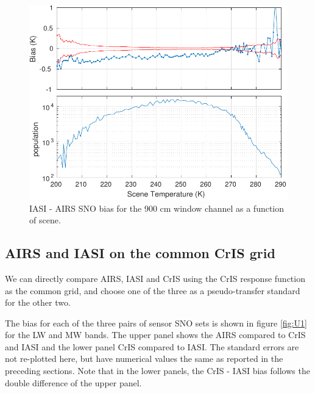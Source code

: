 \documentclass[twocolumn,10pt]{article}
\begin{document}
\begin{figure}[htb]
\centering
\includegraphics[width=\linewidth]{./figs/AI_jplSNO_bias_std_900wn_vScene.pdf}
\caption{\label{fig:orgparagraph20}
   IASI - AIRS SNO bias for the 900 cm window channel as a function of scene.}
\label{fig:Z2}
\end{figure}



\subsection{AIRS and IASI on the common CrIS grid}
\label{sec:orgheadline11}
 We can directly compare AIRS, IASI and CrIS using the CrIS response function as the common grid, and choose one of the three as a pseudo-transfer standard for the other two.

The bias for each of the three pairs of sensor SNO sets is shown in figure \ref{fig:U1} for the LW and MW bands. The upper panel shows the AIRS compared to CrIS and IASI and the lower panel CrIS compared to IASI.  The standard errors are not re-plotted here, but have numerical values the same as reported in the preceding sections. Note that in the lower panels, the CrIS - IASI bias follows the double difference of the upper panel.  
\end{document}
